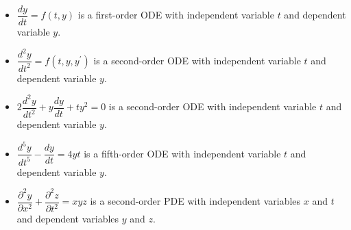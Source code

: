 \documentclass{beamer}
\begin{document}
\begin{frame}
\begin{example}
\begin{itemize}[<+- | alert@+>]
\item $\dfrac{dy}{dt}=f(t,y)$ is a first-order ODE with independent variable $t$ and dependent variable $y$.
\item $\dfrac{d^2 y}{d t^2}=f(t,y,y^\prime)$ is a second-order ODE with independent variable $t$ and dependent variable $y$.
\item $2\dfrac{d^2 y}{d t^2}+y\dfrac{dy}{dt}+ty^2=0$ is a second-order ODE with independent variable $t$ and dependent variable $y$.
\item $\dfrac{d^5 y}{d t^5}-\dfrac{dy}{dt}=4yt$ is a fifth-order ODE with independent variable $t$ and dependent variable $y$.
\item $\dfrac{\partial^2 y}{\partial x^2}+\dfrac{\partial^2 z}{\partial t^2}=xyz$ is a second-order PDE with independent variables $x$ and $t$ and dependent variables $y$ and $z$.
\end{itemize}
\end{example}
\end{frame}
\end{document}
